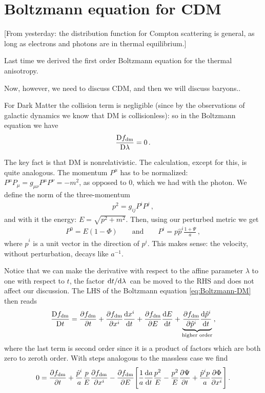 \documentclass[main.tex]{subfiles}
\begin{document}
\section{Boltzmann equation for CDM}


[From yesterday: the distribution function for Compton scattering is general, as long as electrons and photons are in thermal equilibrium.]

Last time we derived the first order Boltzmann equation for the thermal anisotropy. 

Now, however, we need to discuss CDM, and then we will discuss baryons.. 

For Dark Matter the collision term is negligible (since by the observations of galactic dynamics we know that DM is collisionless):
so in the Boltzmann equation we have 
%
\begin{align} \label{eq:Boltzmann-DM}
\frac{\mathrm{D} f _{\text{dm}}}{\mathrm{D} \lambda } = 0
\,.
\end{align}

The key fact is that DM is nonrelativistic. The calculation, except for this, is quite analogous.
The momentum \(P^{\mu }\) has to be normalized: \(P^{\mu }P_{\mu } = g_{\mu \nu } P^{\mu }P^{\nu } = -m^2\), as opposed to \(0\), which we had with the photon. We define the norm of the three-momentum 
%
\begin{align}
p^2 = g_{ij} P^{i} P^{j}
\,,
\end{align}
%
and with it the energy: \(E = \sqrt{p^2+m^2}\). Then, using our perturbed metric we get 
%
\begin{align}
P^{0} = E (1-\Phi )
\qquad \text{and} \qquad
P^{i} = p \hat{p}^{i} \frac{1 + \Psi }{a}
\,,
\end{align}
%
where \(\hat{p}^{i}\) is a unit vector in the direction of \(p^{i}\). 
This makes sense: the velocity, without perturbation, decays like \(a^{-1}\). 

Notice that we can make the derivative with respect to the affine parameter \(\lambda \) to one with respect to \(t\), the factor \(\dv*{t}{\lambda }\) can be moved to the RHS and does not affect our discussion. 
The LHS of the Boltzmann equation \eqref{eq:Boltzmann-DM} then reads 
%
\begin{align}
\frac{\mathrm{D} f_{\text{dm}}}{\mathrm{D} t} = \pdv{f_{\text{dm}}}{t} 
+ \pdv{f _{\text{dm}}}{x^{i}} \dv{x^{i}}{t}
+ \pdv{f _{\text{dm}}}{E} \dv{E}{t}
+ \underbrace{\pdv{f _{\text{dm}}}{\hat{p}^{i}} \dv{\hat{p}^{i}}{t}}_{\text{higher order}}
\,,
\end{align}
%
where the last term is second order since it is a product of factors which are both zero to zeroth order. 
With steps analogous to the massless case we find 
%
\begin{align} 
0= \pdv{f _{\text{dm}}}{t} + \frac{\hat{p}^{i}}{a} \frac{p}{E} \pdv{f _{\text{dm}}}{x^{i}}
- \pdv{f _{\text{dm}}}{E} \qty[
\frac{1}{a} \dv{a}{t} \frac{p^2}{E} - \frac{p^2}{E} \pdv{\Psi }{t} 
+ \frac{\hat{p}^{i} p}{a} \pdv{\Phi }{x^{i}}
]
\,.
\end{align}
\end{document}
